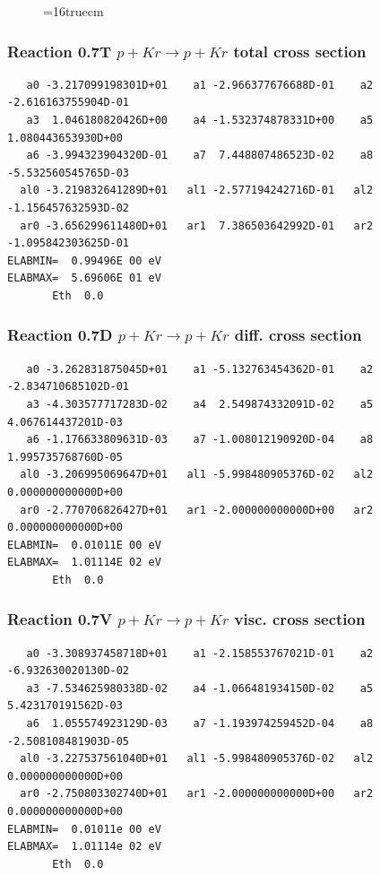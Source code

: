 \documentclass[12pt,dvipdfmx]{article}
\begin{document}
\begin{figure} \label{0.6}
\epsfxsize=16truecm
\end{figure}
\newpage



\subsubsection{
Reaction 0.7T   $ p + Kr \rightarrow p + Kr $ total cross
section }



\begin{small}\begin{verbatim}
   a0 -3.217099198301D+01    a1 -2.966377676688D-01    a2 -2.616163755904D-01
   a3  1.046180820426D+00    a4 -1.532374878331D+00    a5  1.080443653930D+00
   a6 -3.994323904320D-01    a7  7.448807486523D-02    a8 -5.532560545765D-03
  al0 -3.219832641289D+01   al1 -2.577194242716D-01   al2 -1.156457632593D-02
  ar0 -3.656299611480D+01   ar1  7.386503642992D-01   ar2 -1.095842303625D-01
ELABMIN=  0.99496E 00 eV
ELABMAX=  5.69606E 01 eV
       Eth  0.0
\end{verbatim}\end{small}

\subsubsection{
Reaction 0.7D    $p + Kr \rightarrow p + Kr  $ diff. cross
section }


\begin{small}\begin{verbatim}
   a0 -3.262831875045D+01    a1 -5.132763454362D-01    a2 -2.834710685102D-01
   a3 -4.303577717283D-02    a4  2.549874332091D-02    a5  4.067614437201D-03
   a6 -1.176633809631D-03    a7 -1.008012190920D-04    a8  1.995735768760D-05
  al0 -3.206995069647D+01   al1 -5.998480905376D-02   al2  0.000000000000D+00
  ar0 -2.770706826427D+01   ar1 -2.000000000000D+00   ar2  0.000000000000D+00
ELABMIN=  0.01011E 00 eV
ELABMAX=  1.01114E 02 eV
       Eth  0.0
\end{verbatim}\end{small}

\subsubsection{
Reaction 0.7V   $ p + Kr \rightarrow p + Kr  $ visc. cross
section }


\begin{small}\begin{verbatim}
   a0 -3.308937458718D+01    a1 -2.158553767021D-01    a2 -6.932630020130D-02
   a3 -7.534625980338D-02    a4 -1.066481934150D-02    a5  5.423170191562D-03
   a6  1.055574923129D-03    a7 -1.193974259452D-04    a8 -2.508108481903D-05
  al0 -3.227537561040D+01   al1 -5.998480905376D-02   al2  0.000000000000D+00
  ar0 -2.750803302740D+01   ar1 -2.000000000000D+00   ar2  0.000000000000D+00
ELABMIN=  0.01011e 00 eV
ELABMAX=  1.01114e 02 eV
       Eth  0.0
\end{verbatim}\end{small}
\end{document}
